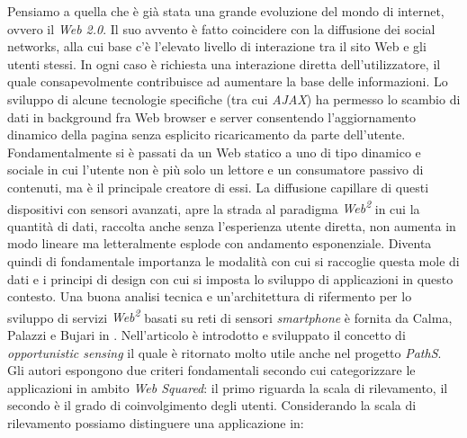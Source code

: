 Pensiamo a quella che è già stata una grande evoluzione del mondo di internet, ovvero il \emph{Web 2.0}. Il suo avvento è fatto coincidere con la diffusione dei social networks, alla cui base c'è l'elevato livello di interazione tra il sito Web e gli utenti stessi. In ogni caso è richiesta una interazione diretta dell'utilizzatore, il quale consapevolmente contribuisce ad aumentare la base delle informazioni. Lo sviluppo di alcune tecnologie specifiche (tra cui \emph{AJAX}) ha permesso lo scambio di dati in background fra Web browser e server consentendo l'aggiornamento dinamico della pagina senza esplicito ricaricamento da parte dell'utente. Fondamentalmente si è passati da un Web statico a uno di tipo dinamico e sociale in cui l'utente non è più solo un lettore e un consumatore passivo di contenuti, ma è il principale creatore di essi.
La diffusione capillare di questi dispositivi con sensori avanzati, apre la strada al paradigma \emph{Web\textsuperscript{2}} in cui la quantità di dati, raccolta anche senza l'esperienza utente diretta, non aumenta in modo lineare ma letteralmente esplode con andamento esponenziale. Diventa quindi di fondamentale importanza le modalità con cui si raccoglie questa mole di dati e i principi di design con cui si imposta lo sviluppo di applicazioni in questo contesto. Una buona analisi tecnica e un'architettura di rifermento per lo sviluppo di servizi \emph{Web\textsuperscript{2}} basati su reti di sensori \emph{smartphone} è fornita da Calma, Palazzi e Bujari in \cite{web2palazzi}. Nell'articolo è introdotto e sviluppato il concetto di \emph{opportunistic sensing} il quale è ritornato molto utile anche nel progetto \emph{PathS}. Gli autori espongono due criteri fondamentali secondo cui categorizzare le applicazioni in ambito \emph{Web Squared}: il primo riguarda la scala di rilevamento, il secondo è il grado di coinvolgimento degli utenti. Considerando la scala di rilevamento possiamo distinguere una applicazione in:

